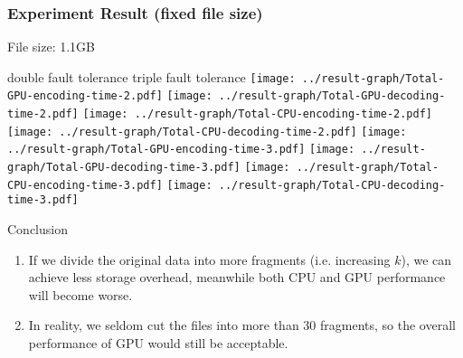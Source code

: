 \documentclass[slidestop,compress,mathserif]{beamer}
\begin{document}
\begin{frame}[options]
\frametitle{Experiment Result (fixed file size)}
{
File size: 1.1GB
}

{
double fault tolerance	
}
{
triple fault tolerance	
}
{
\texttt{[image: ../result-graph/Total-GPU-encoding-time-2.pdf]}
}
{
\texttt{[image: ../result-graph/Total-GPU-decoding-time-2.pdf]}
}
{
\texttt{[image: ../result-graph/Total-CPU-encoding-time-2.pdf]}
}
{
\texttt{[image: ../result-graph/Total-CPU-decoding-time-2.pdf]}
}
{
\texttt{[image: ../result-graph/Total-GPU-encoding-time-3.pdf]}
}
{
\texttt{[image: ../result-graph/Total-GPU-decoding-time-3.pdf]}
}
{
\texttt{[image: ../result-graph/Total-CPU-encoding-time-3.pdf]}
}
{
\texttt{[image: ../result-graph/Total-CPU-decoding-time-3.pdf]}
}
{
\begin{block}{Conclusion}
\begin{enumerate}
\item If we divide the original data into more fragments (i.e. increasing $k$), we can achieve less storage overhead, meanwhile both CPU and GPU performance will become worse.
\item In reality, we seldom cut the files into more than 30 fragments, so the overall performance of GPU would still be acceptable.
\end{enumerate}
\end{block}
}
\end{frame}
\end{document}
